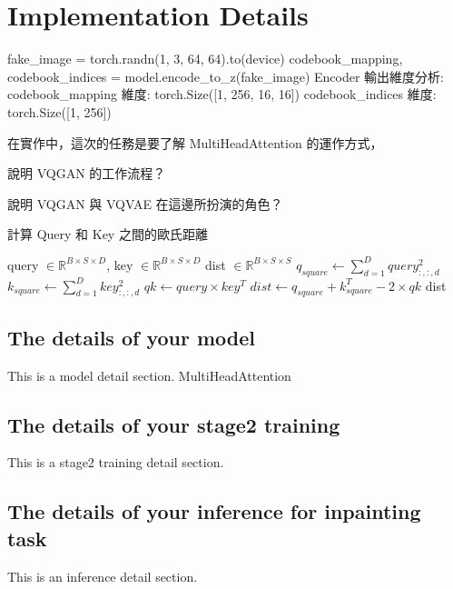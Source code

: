 \clearpage
\section{Implementation Details}

fake_image = torch.randn(1, 3, 64, 64).to(device)
codebook_mapping, codebook_indices = model.encode_to_z(fake_image)
Encoder 輸出維度分析:
codebook_mapping 維度: torch.Size([1, 256, 16, 16])
codebook_indices 維度: torch.Size([1, 256])


在實作中，這次的任務是要了解 MultiHeadAttention 的運作方式，


說明 VQGAN 的工作流程？

說明 VQGAN 與 VQVAE 在這邊所扮演的角色？


\begin{algorithm}[H]
\caption{計算 Query 和 Key 之間的歐氏距離}
\begin{algorithmic}[1]
\REQUIRE query $\in \mathbb{R}^{B \times S \times D}$, key $\in \mathbb{R}^{B \times S \times D}$
\ENSURE dist $\in \mathbb{R}^{B \times S \times S}$
\STATE $q_{square} \gets \sum_{d=1}^D query_{:,:,d}^2$ 
\STATE $k_{square} \gets \sum_{d=1}^D key_{:,:,d}^2$ 
\STATE $qk \gets query \times key^T$ 
\STATE $dist \gets q_{square} + k_{square}^T - 2 \times qk$
\RETURN dist
\end{algorithmic}
\end{algorithm}





\subsection{The details of your model}
This is a model detail section.
MultiHeadAttention

\subsection{The details of your stage2 training}
This is a stage2 training detail section.

\subsection{The details of your inference for inpainting task}
This is an inference detail section. 